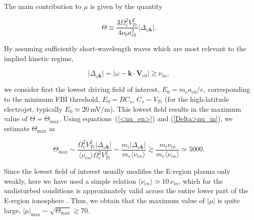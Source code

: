 \documentclass[draft]{agujournal2019}
\renewcommand{\vec}{\mathbf}
\begin{document}
The main contribution to $\mu$ is given by the quantity
\begin{linenomath*}
\begin{equation}
\Theta\equiv\frac{3\Omega_{e}^{2}V_{Te}^{2}}{4\nu_{0}a_{e0}^{2}}
|\Delta_{\omega\vec{k}}| . 
\label{kappa}
\end{equation}
\end{linenomath*}
By assuming sufficiently short-wavelength waves which are most relevant to the implied kinetic regime,
\begin{linenomath*}
\begin{equation}
|\Delta_{\omega\vec{k}}| =|\omega-\vec{k}\cdot\vec{V}_{e0}| \gtrsim\nu_{in}, 
\label{Delta>nu_in}
\end{equation}
\end{linenomath*}
we consider first the lowest driving field of interest, $E_{0}=m_{e}a_{e0}/e$,
corresponding to the minimum FBI threshold, $E_{0}=BC_{s}$, $C_{s}\sim V_{Ti}$ (for the high-latitude electrojet, typically
$E_{0}\simeq20~$mV/m). This lowest field results in the maximum value of
$\Theta=\Theta_{\max}$. Using equations~(\ref{<nu_en>}) and (\ref{Delta>nu_in}), we
estimate $\Theta_{\max}$ as
\begin{linenomath*}
\begin{equation}
\Theta_{\max}\sim\frac{\Omega_{e}^{2}V_{Te}^{2} 
|\Delta_{\omega\vec{k}}|}{\langle \nu_{en}\rangle \Omega_{e}^{2}V_{Ti}^{2}
}\sim\frac{m_{i}|\Delta_{\omega\vec{k}}|}{m_{e}
\langle \nu_{en}\rangle }\gtrsim\frac{m_{i}\nu_{in}}{m_{e}
\langle \nu_{en}\rangle }\simeq5000. 
\label{K_max}
\end{equation}
\end{linenomath*}
Since the lowest field of interest usually modifies the E-region plasma only weakly, 
here we have used a simple relation $\langle \nu_{en}\rangle
\simeq 10\,\nu_{in}$, which for the undisturbed conditions is approximately valid across the entire lower part
of the E-region ionosphere \cite{Gurevich:Nonlinear78,Kelley:Ionosphere09}.
Thus, we obtain that the maximum value of $|\mu| $ is quite
large, $|\mu|_{\max}\sim\sqrt{\Theta_{\max}}\gtrsim70$.
\end{document}
